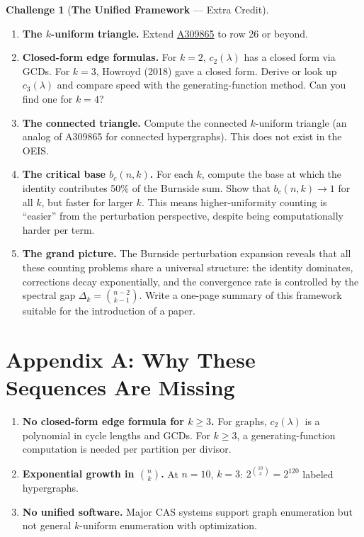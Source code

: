 \documentclass[11pt,letterpaper]{article}
\theoremstyle{definition}
\newtheorem{challenge}{Challenge}
\theoremstyle{remark}
\begin{document}
\begin{challenge}[\textbf{The Unified Framework} --- Extra Credit]\label{chal:unified}
\begin{enumerate}[label=(\alph*)]
  \item \textbf{The $k$-uniform triangle.} Extend \href{https://oeis.org/A309865}{A309865} to row 26 or beyond.

  \item \textbf{Closed-form edge formulas.} For $k = 2$, $c_2(\lambda)$ has a closed form via GCDs. For $k = 3$, Howroyd (2018) gave a closed form. Derive or look up $c_3(\lambda)$ and compare speed with the generating-function method. Can you find one for $k = 4$?

  \item \textbf{The connected triangle.} Compute the connected $k$-uniform triangle (an analog of A309865 for connected hypergraphs). This does not exist in the OEIS.

  \item \textbf{The critical base $b_c(n, k)$.} For each $k$, compute the base at which the identity contributes 50\% of the Burnside sum. Show that $b_c(n,k) \to 1$ for all $k$, but faster for larger $k$. This means higher-uniformity counting is ``easier'' from the perturbation perspective, despite being computationally harder per term.

  \item \textbf{The grand picture.} The Burnside perturbation expansion reveals that all these counting problems share a universal structure: the identity dominates, corrections decay exponentially, and the convergence rate is controlled by the spectral gap $\Delta_k = \binom{n-2}{k-1}$. Write a one-page summary of this framework suitable for the introduction of a paper.
\end{enumerate}
\end{challenge}

\newpage


\section*{Appendix A: Why These Sequences Are Missing}

\begin{enumerate}
  \item \textbf{No closed-form edge formula for $k \geq 3$.} For graphs, $c_2(\lambda)$ is a polynomial in cycle lengths and GCDs. For $k \geq 3$, a generating-function computation is needed per partition per divisor.

  \item \textbf{Exponential growth in $\binom{n}{k}$.} At $n = 10$, $k = 3$: $2^{\binom{10}{3}} = 2^{120}$ labeled hypergraphs.

  \item \textbf{No unified software.} Major CAS systems support graph enumeration but not general $k$-uniform enumeration with optimization.
\end{enumerate}
\end{document}
